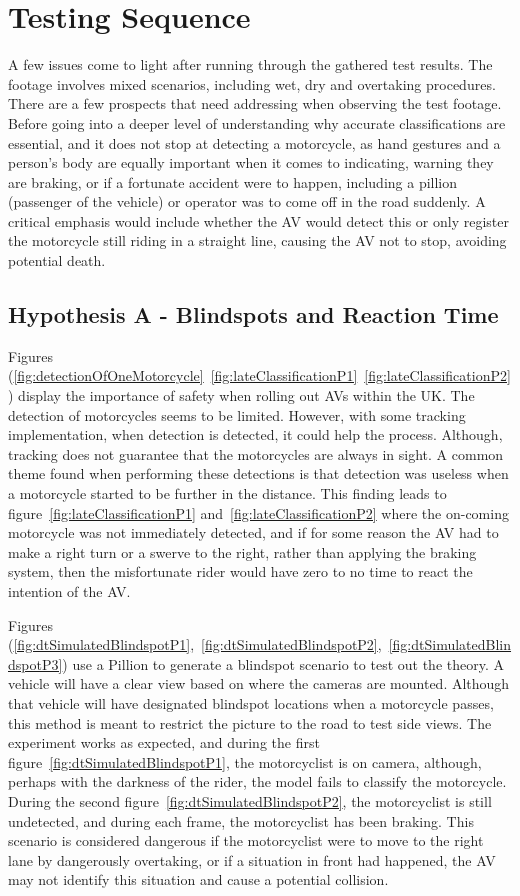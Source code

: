 \documentclass[12pt]{report} %
\begin{document}
	\section{Testing Sequence}
		A few issues come to light after running through the gathered test results. The footage involves mixed scenarios, including wet, dry and overtaking procedures. There are a few prospects that need addressing when observing the test footage. Before going into a deeper level of understanding why accurate classifications are essential, and it does not stop at detecting a motorcycle, as hand gestures and a person's body are equally important when it comes to indicating, warning they are braking, or if a fortunate accident were to happen, including a pillion (passenger of the vehicle) or operator was to come off in the road suddenly. A critical emphasis would include whether the AV would detect this or only register the motorcycle still riding in a straight line, causing the AV not to stop, avoiding potential death.

	\subsection*{Hypothesis A - Blindspots and Reaction Time}
		Figures (\ref{fig:detectionOfOneMotorcycle}~\ref{fig:lateClassificationP1}~\ref{fig:lateClassificationP2}) display the importance of safety when rolling out AVs within the UK. The detection of motorcycles seems to be limited. However, with some tracking implementation, when detection is detected, it could help the process. Although, tracking does not guarantee that the motorcycles are always in sight. A common theme found when performing these detections is that detection was useless when a motorcycle started to be further in the distance. This finding leads to figure~\ref{fig:lateClassificationP1} and~\ref{fig:lateClassificationP2} where the on-coming motorcycle was not immediately detected, and if for some reason the AV had to make a right turn or a swerve to the right, rather than applying the braking system, then the misfortunate rider would have zero to no time to react the intention of the AV.

		Figures (\ref{fig:dtSimulatedBlindspotP1},~\ref{fig:dtSimulatedBlindspotP2},~\ref{fig:dtSimulatedBlindspotP3}) use a Pillion to generate a blindspot scenario to test out the theory. A vehicle will have a clear view based on where the cameras are mounted. Although that vehicle will have designated blindspot locations when a motorcycle passes, this method is meant to restrict the picture to the road to test side views. The experiment works as expected, and during the first figure~\ref{fig:dtSimulatedBlindspotP1}, the motorcyclist is on camera, although, perhaps with the darkness of the rider, the model fails to classify the motorcycle. During the second figure~\ref{fig:dtSimulatedBlindspotP2}, the motorcyclist is still undetected, and during each frame, the motorcyclist has been braking. This scenario is considered dangerous if the motorcyclist were to move to the right lane by dangerously overtaking, or if a situation in front had happened, the AV may not identify this situation and cause a potential collision.
\end{document}
